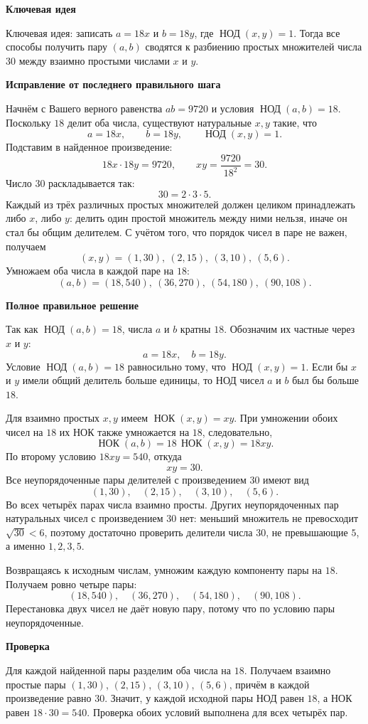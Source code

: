 \documentclass[12pt,a4paper]{article}
\newcommand{\gcdru}{\mathop{\text{НОД}}\nolimits}
\newcommand{\lcmru}{\mathop{\text{НОК}}\nolimits}
\newcommand{\subheading}[1]{\par\smallskip\textbf{#1}\par}
\begin{document}
\subheading{Ключевая идея}
\textcolor{blue!60!black}{Ключевая идея:} записать $a=18x$ и $b=18y$, где $\gcdru(x,y)=1$. Тогда все способы получить пару $(a,b)$ сводятся к разбиению простых множителей числа $30$ между взаимно простыми числами $x$ и $y$.

\subheading{Исправление от последнего правильного шага}
Начнём с Вашего верного равенства $ab=9720$ и условия $\gcdru(a,b)=18$. Поскольку $18$ делит оба числа, существуют натуральные $x,y$ такие, что
\[
a=18x,\qquad b=18y,\qquad\gcdru(x,y)=1.
\]
Подставим в найденное произведение:
\[
18x\cdot18y=9720,
\qquad xy=\frac{9720}{18^2}=30.
\]
Число $30$ раскладывается так:
\[
30=2\cdot3\cdot5.
\]
Каждый из трёх различных простых множителей должен целиком принадлежать либо $x$, либо $y$: делить один простой множитель между ними нельзя, иначе он стал бы общим делителем. С учётом того, что порядок чисел в паре не важен, получаем
\[
(x,y)=(1,30),\ (2,15),\ (3,10),\ (5,6).
\]
Умножаем оба числа в каждой паре на $18$:
\[
(a,b)=(18,540),\ (36,270),\ (54,180),\ (90,108).
\]

\subheading{Полное правильное решение}
Так как $\gcdru(a,b)=18$, числа $a$ и $b$ кратны $18$. Обозначим их частные через $x$ и $y$:
\[
a=18x,\quad b=18y.
\]
Условие $\gcdru(a,b)=18$ равносильно тому, что $\gcdru(x,y)=1$. Если бы $x$ и $y$ имели общий делитель больше единицы, то НОД чисел $a$ и $b$ был бы больше $18$.

Для взаимно простых $x,y$ имеем $\lcmru(x,y)=xy$. При умножении обоих чисел на $18$ их НОК также умножается на $18$, следовательно,
\[
\lcmru(a,b)=18\,\lcmru(x,y)=18xy.
\]
По второму условию $18xy=540$, откуда
\[
xy=30.
\]
Все неупорядоченные пары делителей с произведением $30$ имеют вид
\[
(1,30),\quad(2,15),\quad(3,10),\quad(5,6).
\]
Во всех четырёх парах числа взаимно просты. Других неупорядоченных пар натуральных чисел с произведением $30$ нет: меньший множитель не превосходит $\sqrt{30}<6$, поэтому достаточно проверить делители числа $30$, не превышающие $5$, а именно $1,2,3,5$.

Возвращаясь к исходным числам, умножим каждую компоненту пары на $18$. Получаем ровно четыре пары:
\[
\boxed{(18,540),\quad(36,270),\quad(54,180),\quad(90,108).}
\]
Перестановка двух чисел не даёт новую пару, потому что по условию пары неупорядоченные.

\subheading{Проверка}
Для каждой найденной пары разделим оба числа на $18$. Получаем взаимно простые пары $(1,30)$, $(2,15)$, $(3,10)$, $(5,6)$, причём в каждой произведение равно $30$. Значит, у каждой исходной пары НОД равен $18$, а НОК равен $18\cdot30=540$. Проверка обоих условий выполнена для всех четырёх пар.
\end{document}
